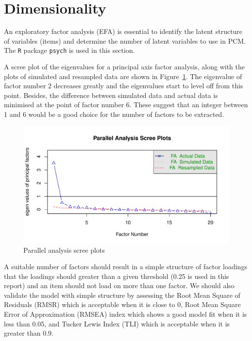 \documentclass[a4paper]{report}
\begin{document}
\section{Dimensionality}

An exploratory factor analysis (EFA) is essential to identify the latent structure of variables (items) and determine the number of latent variables to use in PCM. The \texttt{R} package \texttt{psych} is used in this section. 

A scree plot of the eigenvalues for a principal axis factor analysis, along with the plots of simulated and resampled data are shown in Figure~\ref{fig:EFA_scree}. The eigenvalue of factor number 2 decreases greatly and the eigenvalues start to level off from this point. Besides, the difference between simulated data and actual data is minimised at the point of factor number 6. These suggest that an integer between 1 and 6 would be a good choice for the number of factors to be extracted. 

\begin{figure}[H]
  \centering
  \includegraphics[width=\linewidth]{fig/EFA_scree.pdf}
  \caption{\label{fig:EFA_scree}Parallel analysis scree plots}
\end{figure}

A suitable number of factors should result in a simple structure of factor loadings that the loadings should greater than a given threshold (0.25 is used in this report) and an item should not load on more than one factor. We should also validate the model with simple structure by assessing the Root Mean Square of Residuals (RMSR) which is acceptable when it is close to 0, Root Mean Square Error of Approximation (RMSEA) index which shows a good model fit when it is less than 0.05, and Tucker Lewis Index (TLI) which is acceptable when it is greater than 0.9. 
\end{document}
